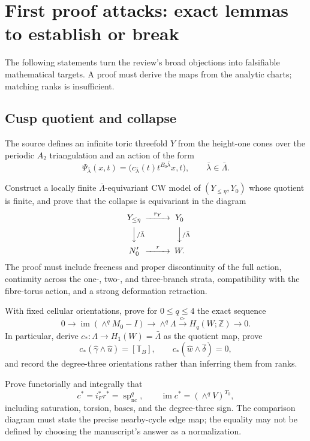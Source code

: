 \section{First proof attacks: exact lemmas to establish or break}

The following statements turn the review's broad objections into falsifiable mathematical targets. A proof must derive the maps from the analytic charts; matching ranks is insufficient.

\subsection{Cusp quotient and collapse}

The source defines an infinite toric threefold $Y$ from the height-one cones over the periodic $A_2$ triangulation and an action of the form
\[
\Psi_{\bar\lambda}(x,t)
=\bigl(c_{\bar\lambda}(t)t^{B_0\bar\lambda}x,t\bigr),
\qquad \bar\lambda\in\bar\Lambda.
\]

\begin{obligation}
Construct a locally finite $\bar\Lambda$-equivariant CW model of $(Y_{\le\eta},Y_0)$ whose quotient is finite, and prove that the collapse is equivariant in the diagram
\[
\begin{CD}
Y_{\le\eta} @>{r_Y}>> Y_0\\
@VV{/\bar\Lambda}V @VV{/\bar\Lambda}V\\
N'_0 @>{r}>> W.
\end{CD}
\]
The proof must include freeness and proper discontinuity of the full action, continuity across the one-, two-, and three-branch strata, compatibility with the fibre-torus action, and a strong deformation retraction.
\end{obligation}

\begin{obligation}
With fixed cellular orientations, prove for $0\le q\le4$ the exact sequence
\[
0\longrightarrow
\operatorname{im}(\wedge^qM_0-I)
\longrightarrow\wedge^q\Lambda
\xrightarrow{c_*}H_q(W;\mathbb Z)
\longrightarrow0.
\]
In particular, derive $c_*\colon\Lambda\to H_1(W)=\bar\Lambda$ as the quotient map, prove
\[
c_*(\widehat\gamma\wedge\widehat u)=[\mathbb T_B],
\qquad
c_*(\widehat w\wedge\widehat\delta)=0,
\]
and record the degree-three orientations rather than inferring them from ranks.
\end{obligation}

\begin{obligation}
Prove functorially and integrally that
\[
c^*=i_F^*r^*=\operatorname{sp}_{\mathrm{nc}}^q,
\qquad
\operatorname{im}c^*=(\wedge^qV)^{T_0},
\]
including saturation, torsion, bases, and the degree-three sign. The comparison diagram must state the precise nearby-cycle edge map; the equality may not be defined by choosing the manuscript's answer as a normalization.
\end{obligation}

